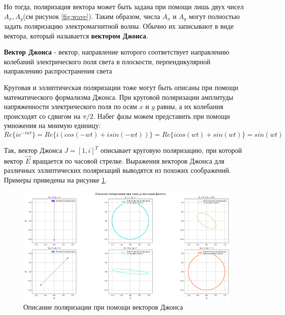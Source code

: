 \documentclass[14pt, singlecolumn, citestyle=authoryear]{elegantbook}
\begin{document}
Но тогда, поляризация вектора может быть задана при помощи лишь двух чисел $A_{x}, A_{y}$(см рисунок \ref{fig:wave}). Таким образом, числа $A_{x}$ и $A_{y}$ могут полностью задать поляризацию электромагнитной волны. Обычно их записывают в виде вектора, который называется \textbf{вектором Джонса}.




\begin{tcolorbox}[enhanced,attach boxed title to top center={yshift=-3mm,yshifttext=-1mm},colback=cyan!5!white,colframe=cyan!75!black,colbacktitle=cyan!80!black,title = Определение ,fonttitle=\bfseries, boxed title style={size=small,colframe=cyan!75!black} ]
    \textbf{\textcolor{href}{Вектор Джонса}} - вектор, направление которого соответствует направлению колебаний электрического поля света в плоскости, перпендикулярной направлению распространения света
\end{tcolorbox}

Круговая и эллиптическая поляризации тоже могут быть описаны при помощи математического формализма Джонса. При круговой поляризации амплитуды напряженности электрического поля по осям $x$ и $y$ равны, а их колебания происходят со сдвигом на $\pi / 2$. Набег фазы можем представить при помощи умножения на мнимую единицу:
$$
Re\{ie^{-iwt}\} = Re\{i(cos(-wt) + isin(-wt))\} = Re\{icos(wt) + sin(wt)\} = sin(wt)
$$

Так, вектор Джонса $J = [1, i]^{T}$ описывает круговую поляризацию, при которой вектор $\vec{E}$ вращается по часовой стрелке. Выражения векторов Джонса для различных эллиптических поляризаций выводятся из похожих соображений. Примеры приведены на рисунке \ref{fig:jones_polarizations}. 

\begin{figure}[htbp]
  \centering
  \includegraphics[width= 1\textwidth]{jones.png}
  \caption{Описание поляризации при помощи векторов Джонса}
  \label{fig:jones_polarizations}
\end{figure}
\end{document}
